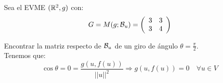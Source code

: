 \begin{ejercicio}
    Sea el EVME $(\mathbb{R}^2, g)$ con:
    \begin{equation*}
        G=M(g;\mathcal{B}_u) = \left(\begin{array}{cc}
            3 & 3 \\
            3 & 4
        \end{array}\right)
    \end{equation*}

    Encontrar la matriz respecto de $\mathcal{B}_u$ de un giro de ángulo $\theta = \frac{\pi}{2}$.\\

    Tenemos que:
    \begin{equation*}
        \cos \theta = 0 = \frac{g(u,f(u))}{||u||^2} \Longrightarrow g(u,f(u)) = 0 \quad \forall u\in V
    \end{equation*}


\end{ejercicio}
